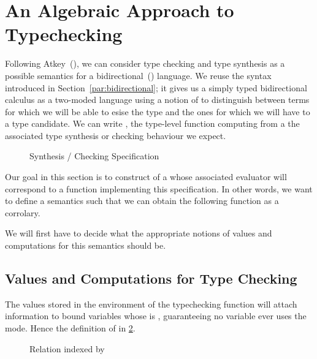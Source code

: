 \section{An Algebraic Approach to Typechecking}
\label{section:typechecking}

Following Atkey~(\citeyear{atkey2015algebraic}), we can consider type
checking and type synthesis as a possible semantics for a
bidirectional~(\cite{pierce2000local}) language.
%
We reuse the syntax introduced in Section~\ref{par:bidirectional}; it
gives us a simply typed bidirectional calculus as a two-moded language using
a notion of  to distinguish between terms for which we will be able
to esise the type and the ones for which we will have to
 a type candidate. We can write , the type-level
function computing from a  the associated type synthesis or
checking behaviour we expect.


\begin{figure}[h]
\caption{ Synthesis / Checking Specification\label{fig:typecheckspec}}
\end{figure}

Our goal in this section is to construct of a  whose
associated evaluator will correspond to a function implementing this
specification. In other words, we want to define a semantics
 such that we can obtain the following  function
as a corrolary.


We will first have to decide what the appropriate notions of values and
computations for this semantics should be.

\subsection{Values and Computations for Type Checking}

The values stored in the environment of the typechecking function will
attach  information to bound variables whose  is
, guaranteeing no variable ever uses the  mode.
Hence the definition of  in \cref{fig:typecheckvar}.

\begin{figure}[h]
\caption{ Relation indexed by \label{fig:typecheckvar}}
\end{figure}

